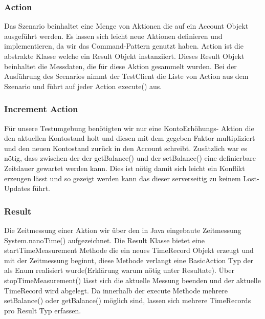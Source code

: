 \subsubsection{Action}
\label{sec:action}
Das Szenario beinhaltet eine Menge von Aktionen die auf ein Account Objekt ausgeführt werden.  Es lassen sich leicht neue Aktionen definieren und implementieren, da wir das Command-Pattern genutzt haben. Action ist die abstrakte Klasse welche ein Result Objekt instanziiert. Dieses Result Objekt beinhaltet die Messdaten, die für diese Aktion gesammelt wurden. Bei der Ausführung des Scenarios nimmt der TestClient die Liste von Action aus dem Szenario und führt auf jeder Action execute() aus.
 
\subsubsection{Increment Action}
\label{sec:incrementAction}
Für unsere Testumgebung benötigten wir nur eine KontoErhöhungs- Aktion die den aktuellen Kontostand holt und diesen mit dem gegeben Faktor multipliziert und den neuen Kontostand zurück in den Account schreibt. Zusätzlich war es nötig, dass zwischen der der getBalance() und der setBalance() eine definierbare Zeitdauer gewartet werden kann. Dies ist nötig damit sich leicht ein Konflikt erzeugen lässt und so gezeigt werden kann das  dieser serverseitig zu keinem Lost-Updates führt.

\subsubsection{Result}
\label{sec:result}
Die Zeitmessung einer Aktion wir über den in Java eingebaute Zeitmessung System.nanoTime() aufgezeichnet. Die Result Klasse bietet eine startTimeMeasurement Methode die ein neues TimeRecord Objekt erzeugt und mit der Zeitmessung beginnt, diese Methode verlangt eine BasicAction Typ der als Enum realisiert wurde(Erklärung warum nötig unter Resultate). Über stopTimeMeasurement() lässt sich die aktuelle Messung beenden und der aktuelle TimeRecord wird abgelegt. Da innerhalb der execute Methode mehrere setBalance() oder getBalance() möglich sind, lassen sich mehrere TimeRecords pro Result Typ erfassen.


